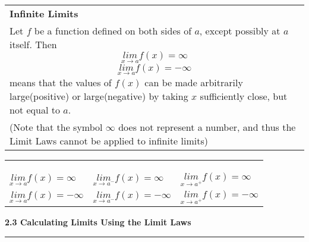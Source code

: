 \documentclass[fleqn]{article}
\begin{document}
\begin{center}
\def\arraystretch{1.3}
{\setlength{\tabcolsep}{16pt}
\begin{tabularx}{.9\textwidth}{|X|}
\hline
	\vspace{1pt}
	\textbf{Infinite Limits} \\
	Let $f$ be a function defined on both sides of $a$, except possibly at $a$ itself. Then
	$$\underset{x \to a}{lim} f(x) = \infty$$
	$$\underset{x \to a}{lim} f(x) = -\infty$$
	means that the values of $f(x)$ can be made arbitrarily large(positive) or large(negative) by taking $x$ sufficiently close, but not equal to $a$. \\[5pt]
	(Note that the symbol $\infty$ does not represent a number, and thus the Limit Laws cannot be applied to infinite limits)\\[16pt]
\hline
\end{tabularx}}
\vspace{12pt}

\def\arraystretch{1.3}
{\setlength{\tabcolsep}{16pt}
\begin{tabularx}{.9\textwidth}{|>{\centering}X >{\centering}X >{\centering\arraybackslash}X|}
\hline
	\vspace{1pt} 
	\pbox{20cm}{\textbf{Vertical Asymptotes}} & & \\
	\multicolumn{3}{|>{\hsize=\dimexpr3\hsize+4\tabcolsep+2\arrayrulewidth\relax}X|}{\vspace{-5pt}The line $x=a$ is called a \textbf{vertical asymptote} of the curve $y=f(x)$ if at least one of the following statements is true:} \\
	\vspace{-12pt} & \vspace{-12pt} & \vspace{-12pt}\\[-12pt]
	$\underset{x \to a}{lim} f(x) = \infty$ & $\underset{x \to a^-}{lim} f(x) = \infty$ & $\underset{x \to a^+}{lim} f(x) = \infty$ \\[12pt]
	$\underset{x \to a}{lim} f(x) = -\infty$ & $\underset{x \to a^-}{lim} f(x) = -\infty$ & $\underset{x \to a^+}{lim} f(x) = -\infty$ \\[16pt]	
\hline
\end{tabularx}}
\vspace{32pt}

\Large\textbf{2.3 Calculating Limits Using the Limit Laws}

\noindent\hfill\rule{0.3\textwidth}{.4pt}\hfill
\vspace{12pt}


\end{center}
\end{document}
